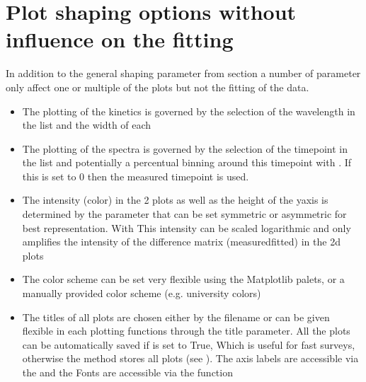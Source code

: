 \documentclass[letterpaper,10pt,english]{sphinxmanual}
\begin{document}
\section{Plot shaping options without influence on the fitting}
\label{\detokenize{Plotting:plot-shaping-options-without-influence-on-the-fitting}}
In addition to the general shaping parameter from section {\hyperref[\detokenize{Shaping:data-shaping-settings-that-affect-the-fits}]{}}
a number of parameter only affect one or multiple of the plots but not the fitting of the data.
\begin{itemize}
\item {} 
The plotting of the kinetics is governed by the selection of the wavelength in the list 
and the width of each 

\item {} 
The plotting of the spectra is governed by the selection of the timepoint in the list  
and potentially a percentual binning around this time\sphinxhyphen{}point with . If this is set to 0
then the measured timepoint is used.

\item {} 
The intensity (color) in the 2 plots as well as the height of the y\sphinxhyphen{}axis is determined by the 
parameter that can be set symmetric or a\sphinxhyphen{}symmetric for best representation. With 
This intensity can be scaled logarithmic and  only amplifies the intensity of the
difference matrix (measured\sphinxhyphen{}fitted) in the 2d plots

\item {} 
The color scheme can be set very flexible using the Matplotlib palets, or a manually provided color scheme
(e.g. university colors)

\item {} 
The titles of all plots are chosen either by the filename or can be given flexible in each plotting functions
through the title parameter. All the plots can be automatically saved if  is set to True,
Which is useful for fast surveys, otherwise the method {\hyperref[\detokenize{plot_func:plot_func.TA.Save_Plots}]{}}
stores all plots (see {\hyperref[\detokenize{Saving:data-export-and-project-saving}]{}}). The axis labels are accessible via the 
and the Fonts are accessible via the function {\hyperref[\detokenize{plot_func:plot_func.changefonts}]{}}

\end{itemize}
\end{document}
